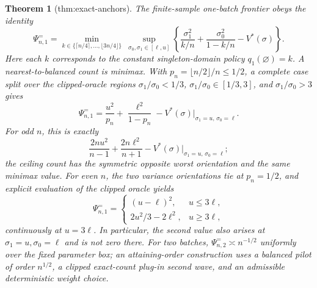 \documentclass{article}
\newtheorem{theorem}{Theorem}
\begin{document}
\begin{theorem}[thm:exact-anchors]\label{thm:exact-anchors}
The finite-sample one-batch frontier obeys the identity \[\Psi^{=}_{n,1}=\min_{k\in\{\lceil n/4\rceil,\ldots,\lfloor3n/4\rfloor\}}\ \sup_{\sigma_0,\sigma_1\in[\ell,u]}\left\{\frac{\sigma_1^2}{k/n}+\frac{\sigma_0^2}{1-k/n}-V^*(\sigma)\right\}.\] Here each \(k\) corresponds to the constant singleton-domain policy \(q_1(\varnothing)=k\). A nearest-to-balanced count is minimax. With \(p_n=\lfloor n/2\rfloor/n\le1/2\), a complete case split over the clipped-oracle regions \(\sigma_1/\sigma_0<1/3\), \(\sigma_1/\sigma_0\in[1/3,3]\), and \(\sigma_1/\sigma_0>3\) gives \[\Psi^{=}_{n,1}=\frac{u^2}{p_n}+\frac{\ell^2}{1-p_n}-V^*(\sigma)\big|_{\sigma_1=u,\,\sigma_0=\ell}.\] For odd \(n\), this is exactly \[\frac{2nu^2}{n-1}+\frac{2n\ell^2}{n+1}-V^*(\sigma)\big|_{\sigma_1=u,\,\sigma_0=\ell};\] the ceiling count has the symmetric opposite worst orientation and the same minimax value. For even \(n\), the two variance orientations tie at \(p_n=1/2\), and explicit evaluation of the clipped oracle yields \[\Psi^{=}_{n,1}=\begin{cases}(u-\ell)^2,&u\le3\ell,\\ 2u^2/3-2\ell^2,&u\ge3\ell,\end{cases}\] continuously at \(u=3\ell\). In particular, the second value also arises at \(\sigma_1=u,\sigma_0=\ell\) and is not zero there. For two batches, \(\Psi^{=}_{n,2}\asymp n^{-1/2}\) uniformly over the fixed parameter box; an attaining-order construction uses a balanced pilot of order \(n^{1/2}\), a clipped exact-count plug-in second wave, and an admissible deterministic weight choice.
\end{theorem}
\end{document}
